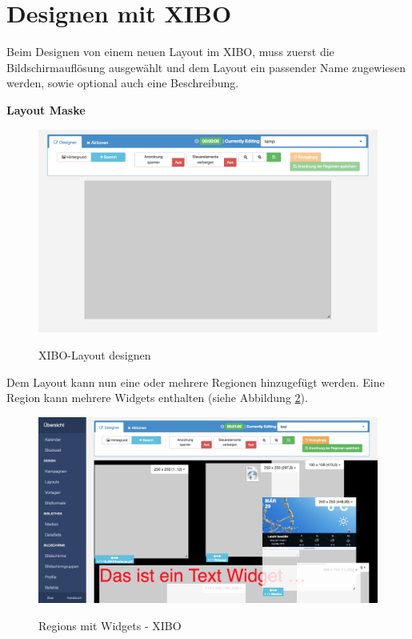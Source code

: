 \section{Designen mit XIBO}\label{sec:designexibo}
Beim Designen von einem neuen Layout im XIBO, muss zuerst die Bildschirmauflösung ausgewählt und dem Layout ein passender Name zugewiesen werden, sowie optional auch eine Beschreibung. 

\textbf{Layout Maske}

\begin{figure}[H]
	\centering
\includegraphics[width=1\textwidth]{images/xibo-basics-designer.png}
	\label{img:designeLayout}
	\caption{XIBO-Layout designen}
\end{figure}	

Dem Layout kann nun eine oder mehrere Regionen hinzugefügt werden. Eine Region kann mehrere Widgets enthalten (siehe Abbildung \ref{img:regions}). 

\begin{figure}[H]
	\centering
\includegraphics[width=1\textwidth]{images/02_XiboGrundlagen/regions.png}
	\label{img:regions}
	\caption{Regions mit Widgets - XIBO}
\end{figure}

